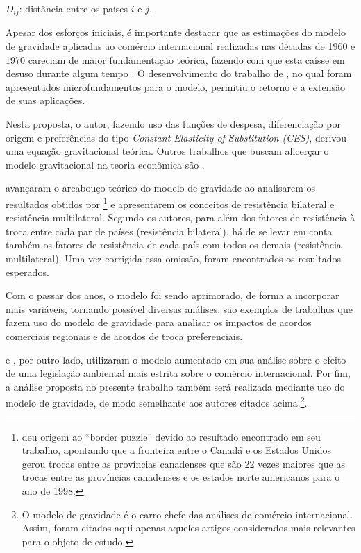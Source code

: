 \documentclass[12pt,
               openright,
               oneside,
               a4paper,
							 section=TITLE,     %
               subsection=Title,  %
               english,brazil]{article}
\begin{document}
 $D_{ij}$: distância entre os países $i$ e $j$.

Apesar dos esforços iniciais, é importante destacar que as estimações do modelo de gravidade aplicadas ao comércio internacional realizadas nas décadas de 1960 e 1970 careciam de maior fundamentação teórica, fazendo com que esta caísse em desuso durante algum tempo \cite{Baldwin2006}. O desenvolvimento do trabalho de , no qual foram apresentados microfundamentos para o modelo, permitiu o retorno e a extensão de suas aplicações. 

Nesta proposta, o autor, fazendo uso das funções de despesa, diferenciação por origem e preferências do tipo \textit{Constant Elasticity of Substitution (CES)}, derivou uma equação gravitacional teórica. Outros trabalhos que buscam alicerçar o modelo gravitacional na teoria econômica são \cite{Bergstrand1985, Bergstrand1989, Deardorff1998}.

 avançaram o arcabouço teórico do modelo de gravidade ao analisarem os resultados obtidos por \footnote{ deu origem ao “border puzzle” devido ao resultado encontrado em seu trabalho, apontando que a fronteira entre o Canadá e os Estados Unidos gerou trocas entre as províncias canadenses que são 22 vezes maiores que as trocas entre as províncias canadenses e os estados norte americanos para o ano de 1998.}  e apresentarem os conceitos de resistência bilateral e resistência multilateral. Segundo os autores, para além dos fatores de resistência à troca entre cada par de países (resistência bilateral), há de se levar em conta também os fatores de resistência de cada país com todos os demais (resistência multilateral). Uma vez corrigida essa omissão, foram encontrados os resultados esperados.
 
Com o passar dos anos, o modelo foi sendo aprimorado, de forma a incorporar mais variáveis, tornando possível diversas análises.  são exemplos de trabalhos que fazem uso do modelo de gravidade para analisar os impactos de acordos comerciais regionais e de acordos de troca preferenciais. 

 e , por outro lado, utilizaram o modelo aumentado em sua análise sobre o efeito de uma legislação ambiental mais estrita sobre o comércio internacional. Por fim, a análise proposta no presente trabalho também será realizada mediante uso do modelo de gravidade, de modo semelhante aos autores citados acima.\footnote{O modelo de gravidade é o carro-chefe das análises de comércio internacional. Assim, foram citados aqui apenas aqueles artigos considerados mais relevantes para o objeto de estudo.}. 
\end{document}
